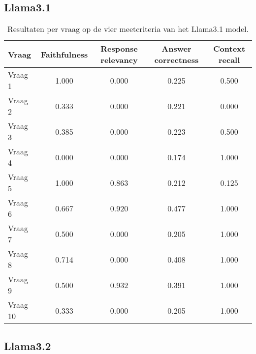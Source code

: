 \subsection{Llama3.1}

\begin{table}[H]
    \begin{tabular}{|l|c|c|c|c|}
        \hline
        \textbf{Vraag} & \textbf{Faithfulness} & \textbf{Response relevancy} & \textbf{Answer correctness} & \textbf{Context recall} \\
        \hline
        Vraag 1 & 1.000 & 0.000 & 0.225 & 0.500 \\
        Vraag 2 & 0.333 & 0.000 & 0.221 & 0.000 \\
        Vraag 3 & 0.385 & 0.000 & 0.223 & 0.500 \\
        Vraag 4 & 0.000 & 0.000 & 0.174 & 1.000 \\
        Vraag 5 & 1.000 & 0.863 & 0.212 & 0.125 \\
        Vraag 6 & 0.667 & 0.920 & 0.477 & 1.000 \\
        Vraag 7 & 0.500 & 0.000 & 0.205 & 1.000 \\
        Vraag 8 & 0.714 & 0.000 & 0.408 & 1.000 \\
        Vraag 9 & 0.500 & 0.932 & 0.391 & 1.000 \\
        Vraag 10 & 0.333 & 0.000 & 0.205 & 1.000 \\
        \hline
    \end{tabular}
    \caption{Resultaten per vraag op de vier meetcriteria van het Llama3.1 model.}
    \label{tab:resultaten_vragen_llama3.1}
\end{table}

\subsection{Llama3.2}

